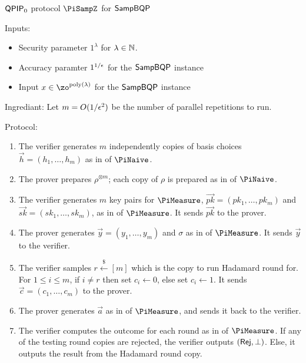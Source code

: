 \begin{protocol}{$\operatorname{\mathsf{QPIP}}_0$ protocol $\PiSampZ$ for $\operatorname{\mathsf{SampBQP}}$}
\label{proto:QPIP0samp}

Inputs:
	\begin{itemize}
		\item Security parameter $1^\lambda$ for $\lambda\in\mathbb{N}$.
		\item Accuracy paramter $1^{1/\epsilon}$ for the $\operatorname{\mathsf{SampBQP}}$ instance
		\item Input $x\in\zo^{\poly(\lambda)}$ for the $\operatorname{\mathsf{SampBQP}}$ instance
	\end{itemize}

Ingrediant: Let $m=O(1/\epsilon^2)$ be the number of parallel repetitions to run.
    
Protocol:
\begin{enumerate}
	\item The verifier generates $m$ independently copies of basis choices $\vec{h}=(h_1,\ldots,h_m)$ as in  of $\PiNaive$.
	\item The prover prepares $\rho^{\otimes m}$; each copy of $\rho$ is prepared as in  of $\PiNaive$.
	\item The verifier generates $m$ key pairs for $\PiMeasure$, $\vec{pk}=(pk_1,\ldots,pk_m)$ and $\vec{sk}=(sk_1,\ldots,sk_m)$, as in  of $\PiMeasure$.
		It sends $\vec{pk}$ to the prover.
	\item The prover generates $\vec{y}=(y_1,\ldots,y_m)$ and $\sigma$ as in  of $\PiMeasure$.
		It sends $\vec{y}$ to the verifier.
	\item The verifier samples $r\xleftarrow{\$}[m]$ which is the copy to run Hadamard round for.
		For $1\leq i\leq m$, if $i\ne r$ then set $c_i\leftarrow 0$, else set $c_i\leftarrow 1$.
		It sends $\vec{c}=(c_1,\ldots,c_m)$ to the prover.
	\item The prover generates $\vec{a}$ as in  of $\PiMeasure$, and sends it back to the verifier.
	\item \label{step:multi-testing}
		The verifier computes the outcome for each round as in  of $\PiMeasure$.
		If any of the testing round copies are rejected, the verifier outputs $(\mathsf{Rej}, \bot)$.
		Else, it outputs the result from the Hadamard round copy.
\end{enumerate}
\end{protocol}


